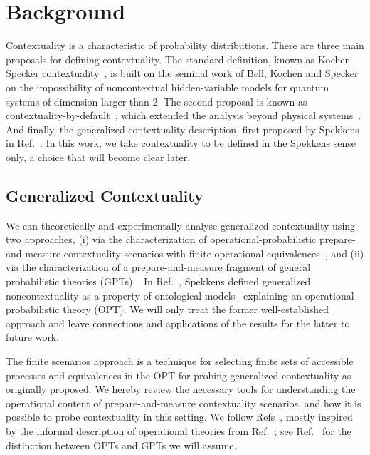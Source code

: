\documentclass[letterpaper,onecolumn,12pt,accepted=2024-01-17]{article}
\begin{document}
\section{Background}

Contextuality is a  characteristic of probability distributions. There are three main proposals for defining contextuality. The standard definition, known as Kochen-Specker contextuality~\cite{Budroni21}, is built on the seminal work of Bell, Kochen and Specker~\cite{KochenS67,Bell64,Bell66} on the impossibility of noncontextual hidden-variable models for quantum systems of dimension larger than $2$. The second proposal is known as contextuality-by-default~\cite{dzhafarov2016contextuality,kujala2022contextuality,kujala2019measures}, which extended the analysis beyond physical systems~\cite{cervantes2018snow}. And finally, the generalized contextuality description, first proposed by Spekkens in Ref.~\cite{spekkens2005contextuality}. In this work, we take contextuality to be defined in the Spekkens sense only, a choice that will become clear later.

\subsection{Generalized Contextuality}\label{subsec: generalized contextuality}
We can theoretically and experimentally analyse generalized contextuality using two approaches, (i) via the characterization of operational-probabilistic prepare-and-measure contextuality scenarios with finite operational equivalences~\cite{schmid2018all,chaturvedi2021characterising,tavakoli2021bounding,schmid2018discrimination,Lostaglio2020contextualadvantage,kunjwal_anomalous_2019}, and (ii) via the characterization of a prepare-and-measure fragment of general probabilistic theories (GPTs)~\cite{schmid2021characterization,shahandeh2021contextuality,selby2021accessible,selby2022open}. In Ref.~\cite{spekkens2005contextuality}, Spekkens defined generalized noncontextuality as a property of ontological models~\cite{leifer2014isthequantum,liang2011specker} explaining an operational-probabilistic theory (OPT). We will only treat the former well-established approach and leave  connections and applications of the results for the latter to future work. 

The finite scenarios approach is a technique for selecting finite sets of accessible processes and equivalences in the OPT for probing generalized contextuality as originally proposed. We hereby review the necessary tools for understanding the operational content of prepare-and-measure contextuality scenarios, and how it is possible to probe contextuality in this setting. We follow Refs~\cite{schmid2018all,chaturvedi2021characterising,tavakoli2021bounding,schmid2018discrimination,Lostaglio2020contextualadvantage,lostaglio_certifying_2020,kunjwal2019beyondcabello,kunjwal_anomalous_2019}, mostly inspired by the informal description of operational theories from Ref.~\cite{spekkens2005contextuality}; see Ref.~\cite{schmid2020structure} for the distinction between OPTs and GPTs we will assume.
\end{document}
